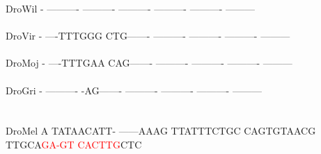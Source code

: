 \documentclass[11pt,twoside,reqno,a4paper]{article}
\begin{document}
{DroWil	-	----------	----------	----------	----------	----------	---------\\
\hspace*{7\charwidth}\hspace*{1\charwidth}\hspace*{1\charwidth}\hspace*{1\charwidth}\hspace*{1\charwidth}\hspace*{1\charwidth}\hspace*{1\charwidth}\\
DroVir	-	----TTTGGG	CTG-------	----------	----------	----------	---------\\
\hspace*{7\charwidth}\hspace*{1\charwidth}\hspace*{1\charwidth}\hspace*{1\charwidth}\hspace*{1\charwidth}\hspace*{1\charwidth}\hspace*{1\charwidth}\\
DroMoj	-	----TTTGAA	CAG-------	----------	----------	----------	---------\\
\hspace*{7\charwidth}\hspace*{1\charwidth}\hspace*{1\charwidth}\hspace*{1\charwidth}\hspace*{1\charwidth}\hspace*{1\charwidth}\hspace*{1\charwidth}\\
DroGri	-	----------	-AG-------	----------	----------	----------	---------\\
\hspace*{7\charwidth}\hspace*{1\charwidth}\hspace*{1\charwidth}\hspace*{1\charwidth}\hspace*{1\charwidth}\hspace*{1\charwidth}\hspace*{1\charwidth}\\
\\
DroMel	A	TATAACATT-	------AAAG	TTATTTCTGC	CAGTGTAACG	TTGCA\textcolor{Red}{G}\textcolor{Red}{A}\textcolor{Red}{-}\textcolor{Red}{G}\textcolor{Red}{T}	\textcolor{Red}{C}\textcolor{Red}{A}\textcolor{Red}{C}\textcolor{Red}{T}\textcolor{Red}{T}\textcolor{Red}{G}CTC\\
}
\end{document}
